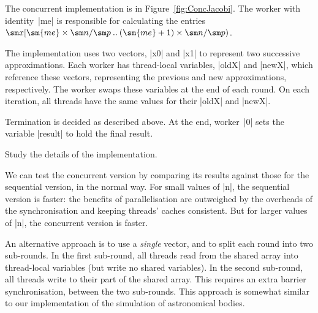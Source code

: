 
The concurrent implementation is in Figure~\ref{fig:ConcJacobi}.  The worker
with identity~|me| is responsible for calculating the entries $\sm x
\interval{\sm{me} \times \sm n / \sm p}{(\sm{me}+1) \times \sm n / \sm p}$.

The implementation uses two vectors, |x0| and |x1| to represent two successive
approximations.  Each worker has thread-local variables, |oldX| and |newX|,
which reference these vectors, representing the previous and new
approximations, respectively.  The worker swaps these variables at the end of
each round.  On each iteration, all threads have the same values for their
|oldX| and |newX|.

Termination is decided as described above.  At the end, worker~|0| sets the
variable |result| to hold the final result.

\begin{instruction}
Study the details of the implementation.
\end{instruction}

We can test the concurrent version by comparing its results against those for
the sequential version, in the normal way.  For small values of |n|, the
sequential version is faster: the benefits of parallelisation are outweighed
by the overheads of the synchronisation and keeping threads' caches
consistent.  But for larger values of |n|, the concurrent version is faster.




An alternative approach is to use a \emph{single} vector, and to split each
round into two sub-rounds.  In the first sub-round, all threads read from the
shared array into thread-local variables (but write no shared variables).  In
the second sub-round, all threads write to their part of the shared array.
This requires an extra barrier synchronisation, between the two sub-rounds.
This approach is somewhat similar to our implementation of the simulation of
astronomical bodies. 

